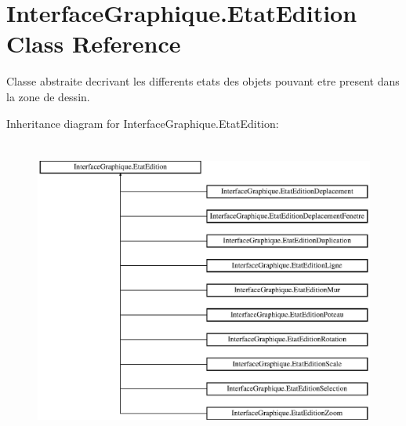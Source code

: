 \hypertarget{class_interface_graphique_1_1_etat_edition}{}\section{Interface\+Graphique.\+Etat\+Edition Class Reference}
\label{class_interface_graphique_1_1_etat_edition}


Classe abstraite decrivant les differents etats des objets pouvant etre present dans la zone de dessin.  


Inheritance diagram for Interface\+Graphique.\+Etat\+Edition\+:\begin{figure}[H]
\begin{center}
\leavevmode
\includegraphics[height=10.000000cm]{class_interface_graphique_1_1_etat_edition}
\end{center}
\end{figure}
